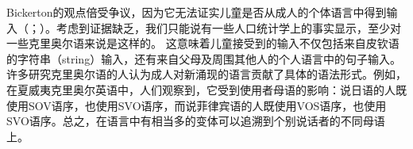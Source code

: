 Bickerton的观点倍受争议，因为它无法证实儿童是否从成人的个体语言中得到输入（\citealp[]{Samarin84a}；\citealp[]{Seuren84a}）。考虑到证据缺乏，我们只能说有一些人口统计学上的事实显示，至少对一些克里奥尔语来说是这样的\citep{Arends2008a}。
这意味着儿童接受到的输入不仅包括来自皮钦语的字符串（string）输入，还有来自父母及周围其他人的个人语言中的句子输入。许多研究克里奥尔语的人认为成人对新涌现的语言贡献了具体的语法形式。例如，在夏威夷克里奥尔英语中，人们观察到，它受到使用者母语的影响：说日语的人既使用SOV语序，也使用SVO语序，而说菲律宾语的人既使用VOS语序，也使用SVO语序。总之，在语言中有相当多的变体可以追溯到个别说话者的不同母语上。

